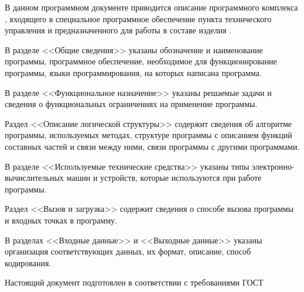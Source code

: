\newpage\annotation

В данном программном документе приводится описание программного комплекса \programname, входящего в специальное программное обеспечение пункта технического управления и предназначенного для работы в составе изделия \productname.

В разделе <<Общие сведения>> указаны обозначение и наименование программы, программное обеспечение, необходимое для функционирование программы, языки программирования, на которых написана программа.

В разделе <<Функциональное назначение>> указаны решаемые задачи и сведения о функциональных ограничениях на применение программы.

Раздел <<Описание логической структуры>> содержит сведения об алгоритме программы, используемых методах, структуре программы с описанием функций составных частей и связи между ними, связи программы с другими программами.

В разделе <<Используемые технические средства>> указаны типы электронно-вычислительных машин и устройств, которые используются при работе программы.

Раздел <<Вызов и загрузка>> содержит сведения о способе вызова программы и входных точках в программу.

В разделах <<Входные данные>> и <<Выходные данные>> указаны организация соответствующих данных, их формат, описание, способ кодирования.

Настоящий документ подготовлен в соответствии с требованиями ГОСТ~\cite{gost19402}
